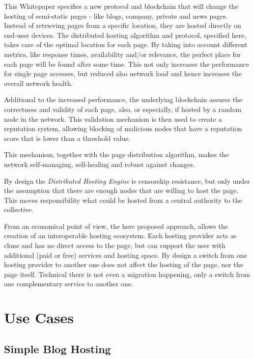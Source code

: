 This Whitepaper specifies a new protocol and blockchain that will change the
hosting of semi-static pages - like blogs, company, private and news pages.
Instead of retrieving
pages from a specific location, they are hosted directly on end-user
devices. The distributed hosting algorithm and protocol, specified here, takes
care of the optimal location for each page. By taking into account different
metrics, like response times, availability and/or relevance, the perfect place
for each page will be found after some time. This not only increases the
performance for single page accesses, but reduced also network load and hence
increases the overall network health.

Additional to the increased performance, the underlying blockchain assures the
correctness and validity of each page, also, or especially, if hosted by a
random node in the network. This validation mechanism is then used to create a
reputation system, allowing blocking of malicious nodes that have a reputation
score that is lower than a threshold value.

This mechanism, together with the page distribution algorithm, makes the
network self-managing, self-healing and robust against changes.

By design the \textit{Distributed Hosting Engine} is censorship resistance,
but only under the assumption that there are enough nodes that are willing to
host the page. This moves responsibility what could be hosted from a central
authority to the collective.

From an economical point of view, the here proposed approach, allows the
creation of an interoperable hosting ecosystem. Each hosting provider acts as
clone and has no direct access to the page, but can support the user with
additional (paid or free) services and hosting space. By design a switch from
one hosting provider to another one does not affect the hosting of the page,
nor the page itself. Technical there is not even a migration happening, only a
switch from one complementary service to another one.

\section{Use Cases}

\subsection{Simple Blog Hosting}

